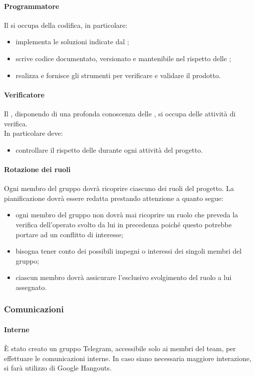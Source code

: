 \paragraph{Programmatore}
 Il \PR{} si occupa della codifica, in particolare:
 \begin{itemize}
  \item implementa le soluzioni indicate dal \PJ ;
  \item scrive codice documentato, versionato e mantenibile nel rispetto delle \NPdoc ;
  \item realizza e fornisce gli strumenti per verificare e validare il prodotto.
 \end{itemize}
 \paragraph{Verificatore}
 Il \VER , disponendo di una profonda conoscenza delle \NPdoc , si occupa delle attività di verifica. \\
 In particolare deve: 
 \begin{itemize}
  \item controllare il rispetto delle \NPdoc durante ogni attività del progetto.
 \end{itemize}
 \paragraph{Rotazione dei ruoli}
 Ogni membro del gruppo dovrà ricoprire ciascuno dei ruoli del progetto. La pianificazione dovrà essere redatta prestando attenzione a quanto segue:
 \begin{itemize}
 	\item ogni membro del gruppo non dovrà mai ricoprire un ruolo che preveda la verifica dell'operato svolto da lui in precedenza poiché questo potrebbe portare ad un conflitto di interesse;
 	\item bisogna tener conto dei possibili impegni o interessi dei singoli membri del gruppo;
 	\item ciascun membro dovrà assicurare l'esclusivo svolgimento del ruolo a lui assegnato.
 \end{itemize}  
\subsubsection{Comunicazioni}
 \paragraph{Interne}
 È stato creato un gruppo Telegram, accessibile solo ai membri del team, per effettuare le comunicazioni interne. In caso siano necessaria maggiore interazione, si farà utilizzo di Google Hangouts. 

